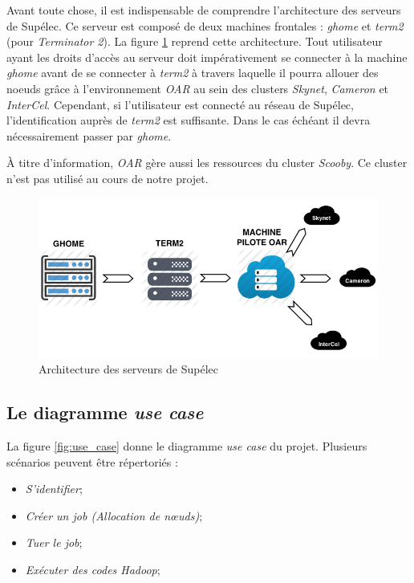 \par Avant toute chose, il est indispensable de comprendre l'architecture des serveurs de Supélec. Ce serveur est composé de deux machines frontales : \emph{ghome} et \emph{term2} (pour \emph{Terminator 2}). La figure \ref{fig:archi_serveur} reprend cette architecture. Tout utilisateur ayant les droits d'accès au serveur doit impérativement se connecter à la machine \emph{ghome} avant de se connecter à \emph{term2} à travers laquelle il pourra allouer des noeuds grâce à l'environnement \emph{OAR} au sein des clusters \emph{Skynet}, \emph{Cameron} et \emph{InterCel}. Cependant, si l'utilisateur est connecté au réseau de Supélec, l'identification auprès de \emph{term2} est suffisante. Dans le cas échéant il devra nécessairement passer par \emph{ghome}.
\par À titre d'information, \emph{OAR} gère aussi les ressources du cluster \emph{Scooby}. Ce cluster n'est pas utilisé au cours de notre projet.

\begin{figure}[h!]
  \centering
  \includegraphics[width=14cm]{images/archi_serveur_supelec.png}
  \caption{Architecture des serveurs de Supélec}
  \label{fig:archi_serveur}
\end{figure}

\subsection{Le diagramme \emph{use case}}
\label{sec:le-diagramme-use}

\par La figure \ref{fig:use_case} donne le diagramme \emph{use case} du projet. Plusieurs scénarios peuvent être répertoriés :

\begin{itemize}
\item \emph{S’identifier};
\item \emph{Créer un job (Allocation de nœuds)};
\item \emph{Tuer le job};
\item \emph{Exécuter des codes Hadoop};
\end{itemize}

